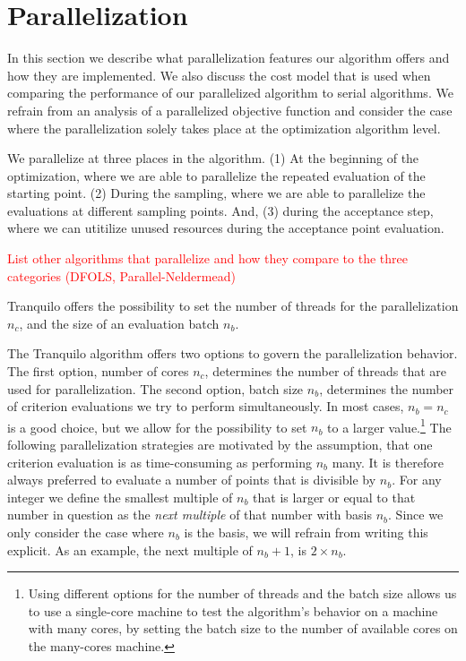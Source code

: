 \section{Parallelization}\label{sec:parallelization}

In this section we describe what parallelization features our algorithm offers and how they are
implemented. We also discuss the cost model that is used when comparing the performance of our
parallelized algorithm to serial algorithms. We refrain from an analysis of a parallelized objective
function and consider the case where the parallelization solely takes place at the optimization
algorithm level.

We parallelize at three places in the algorithm. (1) At the beginning of the optimization, where we
are able to parallelize the repeated evaluation of the starting point. (2) During the sampling,
where we are able to parallelize the evaluations at different sampling points. And, (3) during the
acceptance step, where we can utitilize unused resources during the acceptance point evaluation.

\textcolor{red}{List other algorithms that parallelize and how they compare to the three categories
(DFOLS, Parallel-Neldermead)}

Tranquilo offers the possibility to set the number of threads for the parallelization $n_c$, and the
size of an evaluation batch $n_b$.

The Tranquilo algorithm offers two options to govern the parallelization behavior. The first option,
number of cores $n_c$, determines the number of threads that are used for parallelization. The
second option, batch size $n_b$, determines the number of criterion evaluations we try to perform
simultaneously. In most cases, $n_b = n_c$ is a good choice, but we allow for the
possibility to set $n_b$ to a larger value.\footnote{Using different options for the number of
threads and the batch size allows us to use a single-core machine to test the algorithm's behavior
on a machine with many cores, by setting the batch size to the number of available cores on the
many-cores machine.} The following parallelization strategies are motivated by the assumption, that
one criterion evaluation is as time-consuming as performing $n_b$ many. It is therefore always
preferred to evaluate a number of points that is divisible by $n_b$. For any integer we define
the smallest multiple of $n_b$ that is larger or equal to that number in question as the \emph{next
multiple} of that number with basis $n_b$. Since we only consider the case where $n_b$ is the basis,
we will refrain from writing this explicit. As an example, the next multiple of $n_b + 1$, is $2
\times n_b$.


